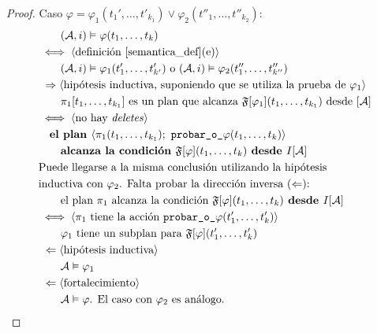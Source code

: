 \begin{proof}
Caso $\varphi = \varphi_1(t_1',\ldots,t'_{k_1}) \lor \varphi_2(t''_1,\ldots,t''_{k_2}) $:
\begin{alignat*}{1}
& \quad \quad (\mathcal{A}, i) \vDash \varphi(t_1,\ldots,t_k)\\
& \iff \langle \text{definición \ref{semantica_def}(e)} \rangle\\
& \quad \quad (\mathcal{A}, i) \vDash \varphi_1(t'_1,\ldots,t'_{k'}) 
\text{ o } (\mathcal{A}, i) \vDash \varphi_2(t''_1,\ldots,t''_{k''})\\
& \ \Rightarrow \langle \text{hipótesis inductiva, suponiendo que se utiliza la
prueba de $\varphi_1$} \rangle\\
& \quad \quad \pi_1[t_1,\ldots,t_{k_1}] \text{ es un plan que alcanza 
$\mathfrak{F}[\varphi_1](t_1,\ldots,t_{k_1})$ desde $[\mathcal{A}]$}\\
& \iff \langle \text{no hay \textit{deletes}} \rangle\\
& \quad \textbf{el plan } \langle \pi_1(t_1,\ldots,t_{k_1});\
\texttt{probar\_o\_}\varphi(t_1,\ldots,t_k) \rangle \\
& \quad \quad \textbf{alcanza la condición }
\mathfrak{F}[\varphi](t_1,\ldots,t_k) \textbf{ desde } I[\mathcal{A}]\\
& \text{Puede llegarse a la misma conclusión utilizando la hipótesis}\\
& \text{inductiva con $\varphi_2$. Falta probar la dirección inversa
($\Leftarrow$):}\\
& \quad\quad \text{el plan } \pi_1\ \text{alcanza la condición }
\mathfrak{F}[\varphi](t_1,\ldots,t_k) \textbf{ desde } I[\mathcal{A}]\\
& \iff \langle \text{$\pi_1$ tiene la acción
    \texttt{probar\_o\_}$\varphi(t_1',\ldots,t_k')$} \rangle\\
& \quad\quad \varphi_1 \text{ tiene un subplan para } \mathfrak{F}[\varphi](t_1',\ldots,t_k')\\
& \ \Leftarrow \langle \text{hipótesis inductiva} \rangle\\
& \quad\quad \mathcal{A} \vDash \varphi_1\\
& \ \Leftarrow \langle \text{fortalecimiento} \rangle\\
& \quad\quad \mathcal{A} \vDash \varphi\text{. El caso con $\varphi_2$ es análogo.}
\end{alignat*}


\end{proof}

